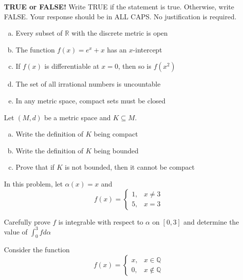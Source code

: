 \documentclass[11pt]{exam}
\theoremstyle{definition}
\begin{document}

\begin{questions}

\addpoints

\question[10]\mbox{}
\textbf{TRUE or FALSE!}  Write  TRUE if the statement is true.  Otherwise, write FALSE.  Your response should be in ALL CAPS.  No justification is required.
\begin{enumerate}[(a)]
\item Every subset of $\mathbb{R}$ with the discrete metric is open
\vspace{1.2in}
\item The function $f(x) = e^x+x$ has an $x$-intercept
\vspace{1.2in}
\item If $f(x)$ is differentiable at $x=0$, then so is $f(x^2)$
\vspace{1.2in}
\item The set of all irrational numbers is uncountable
\vspace{1.2in}
\item In any metric space, compact sets must be closed
\vspace{1.2in}
\end{enumerate}

\newpage
\question[10]\mbox{}
Let $(M,d)$ be a metric space and $K\subseteq M$.
\begin{enumerate}[(a)]
\item Write the definition of $K$ being compact
\vspace{2in}
\item Write the definition of $K$ being bounded
\vspace{2in}
\item Prove that if $K$ is not bounded, then it cannot be compact
\end{enumerate}

\newpage
\question[10]\mbox{}
In this problem, let $\alpha(x) = x$ and
$$f(x) = \left\lbrace\begin{array}{cc}
1, & x\neq 3\\
5, & x =   3
\end{array}\right.$$

Carefully prove $f$ is integrable with respect to $\alpha$ on $[0,3]$ and determine the value of $\int_0^3 fd\alpha$

\newpage
\question[10]\mbox{}

Consider the function
$$f(x) = \left\lbrace\begin{array}{cc}
x, & x\in \mathbb{Q}\\
0, & x\notin \mathbb{Q}
\end{array}\right.$$


\end{questions}
\end{document}
